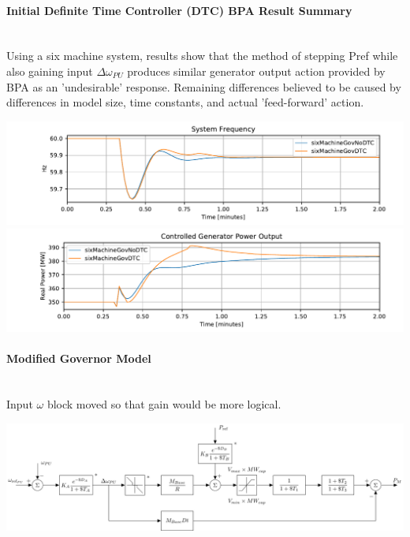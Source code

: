 \documentclass[12pt]{article}
\begin{document}
\paragraph{Initial Definite Time Controller (DTC) BPA Result Summary} \ \\
Using a six machine system, results show that the method of stepping Pref while also gaining input $\Delta\omega_{PU}$ produces similar generator output action provided by BPA as an 'undesirable' response.
Remaining differences believed to be caused by differences in model size, time constants, and actual 'feed-forward' action.

\includegraphics[width=\linewidth]{figures/f}
\includegraphics[width=\linewidth]{figures/pe}



\paragraph{Modified Governor Model} \ \\
Input $\omega$ block moved so that gain would be more logical.

\includegraphics[width=\linewidth]{../../models/tgov1/tgov1DBdelay}
\end{document}
